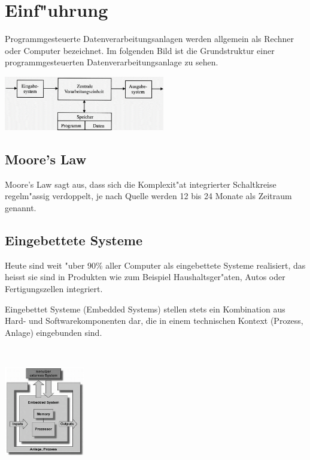 \section{Einf"uhrung}
Programmgesteuerte Datenverarbeitungsanlagen werden allgemein als Rechner oder Computer bezeichnet. Im folgenden Bild ist die Grundstruktur einer programmgesteuerten Datenverarbeitungsanlage zu sehen.

\includegraphics[width = 7cm]{pics/Datenverarbeitungsanlage}

\subsection{Moore's Law}
Moore's Law sagt aus, dass sich die Komplexit"at integrierter Schaltkreise regelm"assig verdoppelt, je nach Quelle werden 12 bis 24 Monate als Zeitraum genannt.

\subsection{Eingebettete Systeme}
\vspace{-4ex}
\begin{minipage}[c]{10cm}
\vspace{-2ex}
Heute sind weit "uber 90\% aller Computer als eingebettete Systeme realisiert, das heisst sie sind in Produkten wie zum Beispiel Haushaltsger"aten, Autos oder Fertigungszellen integriert.

Eingebettet Systeme (Embedded Systems) stellen stets ein Kombination aus Hard- und Softwarekomponenten dar, die in einem technischen Kontext (Prozess, Anlage) eingebunden sind.
\end{minipage}
%
\begin{minipage}{0.5cm}
	\ \
\end{minipage}
\begin{minipage}[c]{6cm}
	\includegraphics[width=3.5cm]{pics/Embedded-System}
\end{minipage}

